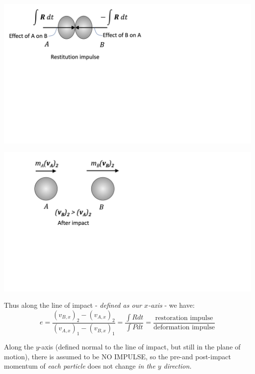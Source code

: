 \documentclass[12pt,letterpaper,twoside]{report}
\begin{document}
\begin{minipage}{0.37\textwidth}
\includegraphics[trim={0cm 9cm 15cm 0cm},clip,height=0.6\textwidth, center]{Slide110}

\includegraphics[trim={0cm 9cm 15cm 0cm},clip,height=0.6\textwidth, center]{Slide111}

\end{minipage}

\newpage

Thus along the line of impact - \textit{defined as our $x$-axis} - we have:
\[
e = \displaystyle \frac{(v_{B,x})_2 - (v_{A,x})_2}{(v_{A,x})_1 - (v_{B,x})_1} = \frac{\displaystyle \int R dt}{\displaystyle \int P dt} = \frac{\text{restoration impulse}}{\text{deformation impulse}}
\]

Along the $y$-axis (defined normal to the line of impact, but still in the plane of motion), there is assumed to be NO IMPULSE, so the pre-and post-impact momentum of \textit{each particle} does not change \textit{in the $y$ direction.}
\end{document}
